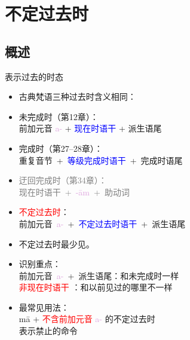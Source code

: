 \documentclass[17pt]{beamer}
\newcommand{\fullpada}[1]{\textcolor{OliveGreen}{#1}}
\newcommand{\pratyaya}[1]{\mbox{\textcolor{Plum}{#1}}}
\newcommand{\veryimportant}[1]{\textcolor{red}{#1}}
\newcommand{\important}[1]{\textcolor{blue}{#1}}
\newcommand{\notsoimportant}[1]{\textcolor{gray}{#1}}
\begin{document}
\section[不定过去]{不定过去时}
\begin{frame}{\insertsection}
  \small
  \tableofcontents[currentsection]
\end{frame}

\subsection{概述}
\begin{frame}{表示过去的时态}
  \small
  \begin{itemize}
    \item 古典梵语三种过去时含义相同：\\

    \item 未完成时（第12章）：\\
    前加元音 \pratyaya{a-} + \important{现在时语干} + 派生语尾
    \item 完成时（第27--28章）：\\
    \mbox{重复音节 + \important{等级完成时语干} + 完成时语尾}
    \item \notsoimportant{迂回完成时（第34章）：\\
    \mbox{现在时语干 + \pratyaya{-ām} + 助动词}}
    \item \veryimportant{不定过去时}：\\
    \mbox{前加元音 \pratyaya{a-} + \important{不定过去时语干} + 派生语尾}
  \end{itemize}
\end{frame}

\begin{frame}{\insertsection}
  \small
  \begin{itemize}
    \item 不定过去时最少见。
    \item 识别重点：\\
    \mbox{前加元音 \pratyaya{a-} + 派生语尾：和未完成时一样}\\
    \veryimportant{非现在时语干} ：和以前见过的哪里不一样
    \item 最常见用法：\\
    \fullpada{mā} + \veryimportant{不含前加元音 \pratyaya{a-} }的不定过去时\\
    表示禁止的命令
  \end{itemize}
\end{frame}
\end{document}
